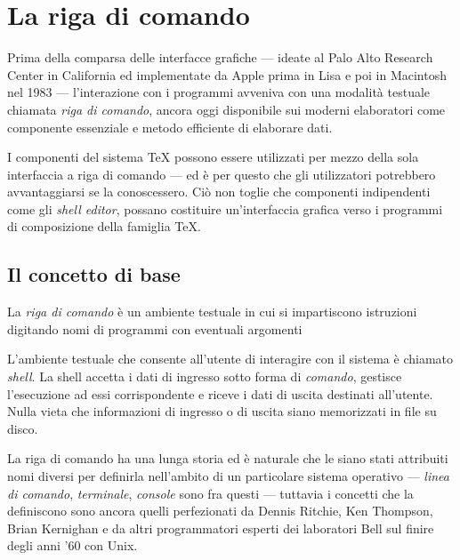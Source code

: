 
\chapter{La riga di comando}
\label{chapConsole}

Prima della comparsa delle interfacce grafiche --- ideate al Palo Alto Research Center in California ed implementate da Apple prima in Lisa e poi in Macintosh nel 1983 --- l'interazione con i programmi avveniva con una modalità testuale chiamata \emph{riga di comando}, ancora oggi disponibile sui moderni elaboratori come componente essenziale e metodo efficiente di elaborare dati.

I componenti del sistema \TeX{} possono essere utilizzati per mezzo della sola interfaccia a riga di comando --- ed è per questo che gli utilizzatori potrebbero avvantaggiarsi se la conoscessero. Ciò non toglie che componenti indipendenti come gli \emph{shell editor}, possano costituire un'interfaccia grafica verso i programmi di composizione della famiglia \TeX{}. 

\section{Il concetto di base}

\begin{tcolorbox}[title=Definizione di \emph{Riga di comando}]
La \emph{riga  di comando} è un ambiente testuale in cui si impartiscono istruzioni digitando nomi di programmi con eventuali argomenti
\end{tcolorbox}

L'ambiente testuale che consente all'utente di interagire  con il sistema è chiamato \emph{shell}. La shell accetta  i dati di ingresso sotto forma di \emph{comando}, gestisce l'esecuzione ad essi corrispondente e riceve i dati di uscita destinati all'utente. Nulla vieta che informazioni di ingresso o di uscita siano memorizzati in file su disco.

La riga di comando ha una lunga storia ed è naturale che le siano stati attribuiti nomi diversi per definirla nell'ambito di un particolare sistema operativo --- \emph{linea di comando}, \emph{terminale}, \emph{console} sono fra questi --- tuttavia i concetti che la definiscono sono ancora quelli perfezionati da Dennis Ritchie, Ken Thompson, Brian Kernighan e da altri programmatori esperti dei laboratori Bell sul finire degli anni '60 con Unix.

